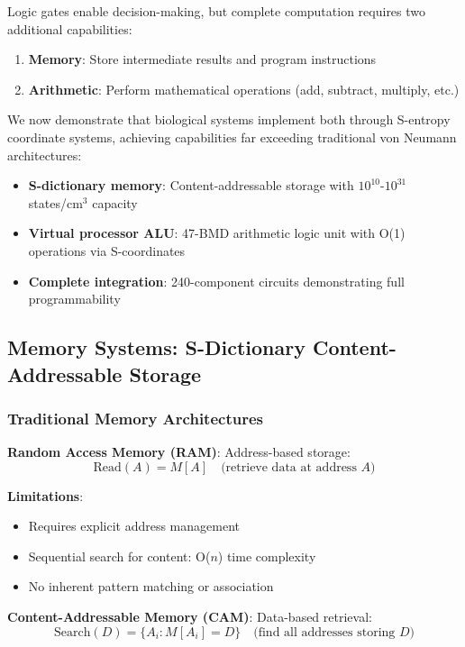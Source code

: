 \documentclass[11pt,a4paper]{article}
\begin{document}
Logic gates enable decision-making, but complete computation requires two additional capabilities\cite{vonneumann1945first}:
\begin{enumerate}
\item \textbf{Memory}: Store intermediate results and program instructions
\item \textbf{Arithmetic}: Perform mathematical operations (add, subtract, multiply, etc.)
\end{enumerate}

We now demonstrate that biological systems implement both through S-entropy coordinate systems, achieving capabilities far exceeding traditional von Neumann architectures:
\begin{itemize}
\item \textbf{S-dictionary memory}: Content-addressable storage with $10^{10}$-$10^{31}$ states/cm$^3$ capacity
\item \textbf{Virtual processor ALU}: 47-BMD arithmetic logic unit with O(1) operations via S-coordinates
\item \textbf{Complete integration}: 240-component circuits demonstrating full programmability
\end{itemize}

\subsection{Memory Systems: S-Dictionary Content-Addressable Storage}

\subsubsection{Traditional Memory Architectures}

\textbf{Random Access Memory (RAM)}: Address-based storage\cite{patterson2013computer}:
\begin{equation}
\text{Read}(A) = M[A] \quad \text{(retrieve data at address } A\text{)}
\end{equation}

\textbf{Limitations}:
\begin{itemize}
\item Requires explicit address management
\item Sequential search for content: O($n$) time complexity
\item No inherent pattern matching or association
\end{itemize}

\textbf{Content-Addressable Memory (CAM)}: Data-based retrieval\cite{pagiamtzis2006content}:
\begin{equation}
\text{Search}(D) = \{A_i : M[A_i] = D\} \quad \text{(find all addresses storing } D\text{)}
\end{equation}
\end{document}
